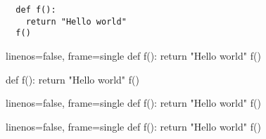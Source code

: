 \documentclass{article}
\begin{document}
\begin{verbatim}
  def f():
    return "Hello world"
  f()
\end{verbatim}

\begin{pycode}{
  linenos=false, frame=single
}
  def f():
    return "Hello world"
  f()
\end{pycode}

\begin{pyblock*}[session][
  linenos=false, frame=single
]
  def f():
    return "Hello world"
  f()
\end{pyblock*}

\begin{sageverbatim*}{
  linenos=false, frame=single
}
  def f():
    return "Hello world"
  f()
\end{sageverbatim*}

\begin{sympyconsole*}{linenos=false, frame=single}
  def f():
    return "Hello world"
  f()
\end{sympyconsole*}
\end{document}
